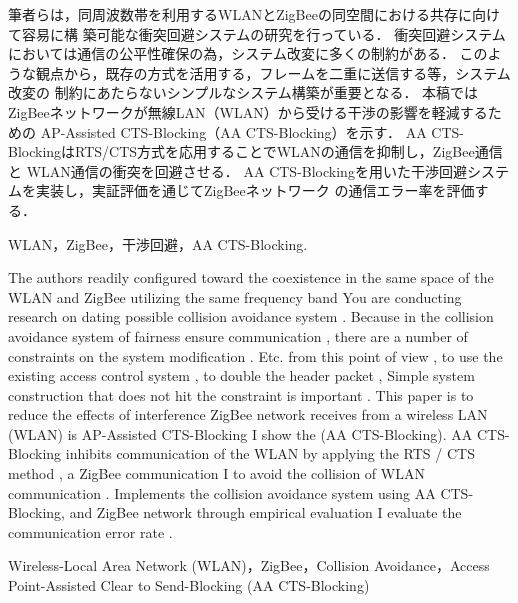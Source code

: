 \documentclass[technicalreport]{ieicej}
\begin{document}
\begin{jabstract}
 筆者らは，同周波数帯を利用するWLANとZigBeeの同空間における共存に向けて容易に構
 築可能な衝突回避システムの研究を行っている．
 衝突回避システムにおいては通信の公平性確保の為，システム改変に多くの制約がある．
 このような観点から，既存の方式を活用する，フレームを二重に送信する等，システム改変の
 制約にあたらないシンプルなシステム構築が重要となる．
 本稿ではZigBeeネットワークが無線LAN（WLAN）から受ける干渉の影響を軽減するための
 AP-Assisted CTS-Blocking（AA CTS-Blocking）を示す．
 AA CTS-BlockingはRTS/CTS方式を応用することでWLANの通信を抑制し，ZigBee通信と
 WLAN通信の衝突を回避させる．
 AA CTS-Blockingを用いた干渉回避システムを実装し，実証評価を通じてZigBeeネットワーク
 の通信エラー率を評価する．
\end{jabstract}

\begin{jkeyword}
 WLAN，ZigBee，干渉回避，AA CTS-Blocking.
\end{jkeyword}

\begin{eabstract}
 The authors readily configured toward the coexistence in the same space of the WLAN and ZigBee utilizing the same frequency band
 You are conducting research on dating possible collision avoidance system .
 Because in the collision avoidance system of fairness ensure communication , there are a number of constraints on the system modification .
 Etc. from this point of view , to use the existing access control system , to double the header packet ,
 Simple system construction that does not hit the constraint is important .
 This paper is to reduce the effects of interference ZigBee network receives from a wireless LAN (WLAN) is
 AP-Assisted CTS-Blocking I show the (AA CTS-Blocking).
 AA CTS-Blocking inhibits communication of the WLAN by applying the RTS / CTS method , a ZigBee communication
 I to avoid the collision of WLAN communication .
 Implements the collision avoidance system using AA CTS-Blocking, and ZigBee network through empirical evaluation
 I evaluate the communication error rate .
\end{eabstract}

\begin{ekeyword}
 Wireless-Local Area Network (WLAN)，ZigBee，Collision Avoidance，Access Point-Assisted 
 Clear to Send-Blocking (AA CTS-Blocking)
\end{ekeyword}
\end{document}
